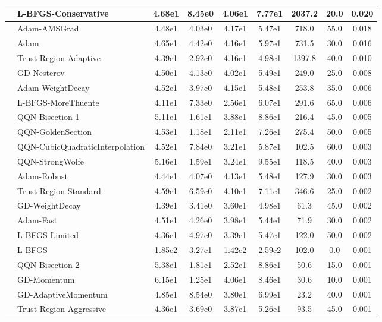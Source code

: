 \documentclass{article}
\begin{document}
\begin{longtable}{|l|l|c|c|c|c|c|c|c|}
\hline
 & L-BFGS-Conservative & 4.68e1 & 8.45e0 & 4.06e1 & 7.77e1 & 2037.2 & 20.0 & 0.020 \\
\hline
 & Adam-AMSGrad & 4.48e1 & 4.03e0 & 4.17e1 & 5.47e1 & 718.0 & 55.0 & 0.018 \\
\hline
 & Adam & 4.65e1 & 4.42e0 & 4.16e1 & 5.97e1 & 731.5 & 30.0 & 0.016 \\
\hline
 & Trust Region-Adaptive & 4.39e1 & 2.92e0 & 4.16e1 & 4.98e1 & 1397.8 & 40.0 & 0.010 \\
\hline
 & GD-Nesterov & 4.50e1 & 4.13e0 & 4.02e1 & 5.49e1 & 249.0 & 25.0 & 0.008 \\
\hline
 & Adam-WeightDecay & 4.52e1 & 3.97e0 & 4.15e1 & 5.48e1 & 253.8 & 35.0 & 0.006 \\
\hline
 & L-BFGS-MoreThuente & 4.11e1 & 7.33e0 & 2.56e1 & 6.07e1 & 291.6 & 65.0 & 0.006 \\
\hline
 & QQN-Bisection-1 & 5.11e1 & 1.61e1 & 3.88e1 & 8.86e1 & 216.4 & 45.0 & 0.005 \\
\hline
 & QQN-GoldenSection & 4.53e1 & 1.18e1 & 2.11e1 & 7.26e1 & 275.4 & 50.0 & 0.005 \\
\hline
 & QQN-CubicQuadraticInterpolation & 4.52e1 & 7.84e0 & 3.21e1 & 5.87e1 & 102.5 & 60.0 & 0.003 \\
\hline
 & QQN-StrongWolfe & 5.16e1 & 1.59e1 & 3.24e1 & 9.55e1 & 118.5 & 40.0 & 0.003 \\
\hline
 & Adam-Robust & 4.44e1 & 4.07e0 & 4.13e1 & 5.48e1 & 127.9 & 30.0 & 0.003 \\
\hline
 & Trust Region-Standard & 4.59e1 & 6.59e0 & 4.10e1 & 7.11e1 & 346.6 & 25.0 & 0.002 \\
\hline
 & GD-WeightDecay & 4.39e1 & 3.41e0 & 3.60e1 & 4.98e1 & 61.3 & 45.0 & 0.002 \\
\hline
 & Adam-Fast & 4.51e1 & 4.26e0 & 3.98e1 & 5.44e1 & 71.9 & 30.0 & 0.002 \\
\hline
 & L-BFGS-Limited & 4.36e1 & 4.97e0 & 3.39e1 & 5.47e1 & 122.0 & 50.0 & 0.002 \\
\hline
 & L-BFGS & 1.85e2 & 3.27e1 & 1.42e2 & 2.59e2 & 102.0 & 0.0 & 0.001 \\
\hline
 & QQN-Bisection-2 & 5.38e1 & 1.81e1 & 2.52e1 & 8.86e1 & 50.6 & 15.0 & 0.001 \\
\hline
 & GD-Momentum & 6.15e1 & 1.25e1 & 4.06e1 & 8.46e1 & 30.6 & 10.0 & 0.001 \\
\hline
 & GD-AdaptiveMomentum & 4.85e1 & 8.54e0 & 3.80e1 & 6.99e1 & 23.2 & 40.0 & 0.001 \\
\hline
 & Trust Region-Aggressive & 4.36e1 & 3.69e0 & 3.87e1 & 5.26e1 & 93.5 & 45.0 & 0.001 \\

\end{longtable}
\end{document}
